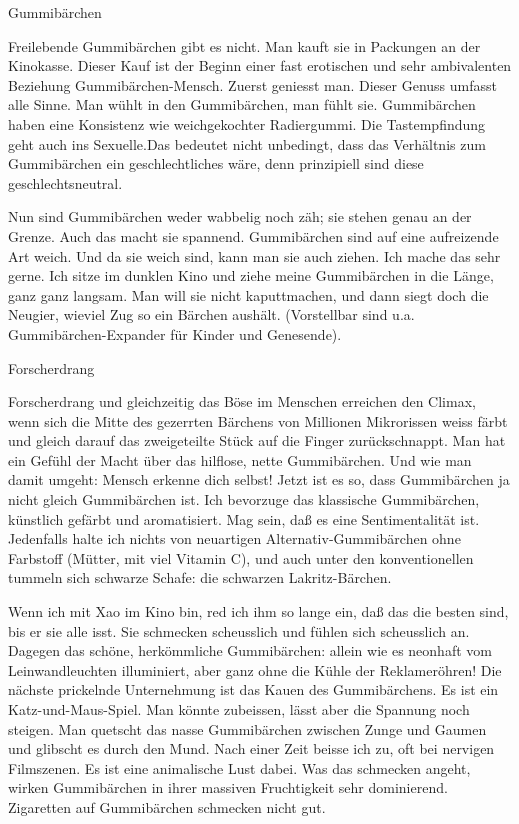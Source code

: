 Gummibärchen

Freilebende Gummibärchen gibt es nicht. Man kauft sie in Packungen an der Kinokasse. Dieser Kauf ist der Beginn einer fast erotischen und sehr ambivalenten Beziehung Gummibärchen-Mensch. Zuerst geniesst man. Dieser Genuss umfasst alle Sinne. Man wühlt in den Gummibärchen, man fühlt sie. Gummibärchen haben eine Konsistenz wie weichgekochter Radiergummi. Die Tastempfindung geht auch ins Sexuelle.Das bedeutet nicht unbedingt, dass das Verhältnis zum Gummibärchen ein geschlechtliches wäre, denn prinzipiell sind diese geschlechtsneutral.

Nun sind Gummibärchen weder wabbelig noch zäh; sie stehen genau an der Grenze. Auch das macht sie spannend. Gummibärchen sind auf eine aufreizende Art weich. Und da sie weich sind, kann man sie auch ziehen. Ich mache das sehr gerne. Ich sitze im dunklen Kino und ziehe meine Gummibärchen in die Länge, ganz ganz langsam. Man will sie nicht kaputtmachen, und dann siegt doch die Neugier, wieviel Zug so ein Bärchen aushält. (Vorstellbar sind u.a. Gummibärchen-Expander für Kinder und Genesende).

Forscherdrang

Forscherdrang und gleichzeitig das Böse im Menschen erreichen den Climax, wenn sich die Mitte des gezerrten Bärchens von Millionen Mikrorissen weiss färbt und gleich darauf das zweigeteilte Stück auf die Finger zurückschnappt. Man hat ein Gefühl der Macht über das hilflose, nette Gummibärchen. Und wie man damit umgeht: Mensch erkenne dich selbst! Jetzt ist es so, dass Gummibärchen ja nicht gleich Gummibärchen ist. Ich bevorzuge das klassische Gummibärchen, künstlich gefärbt und aromatisiert. Mag sein, daß es eine Sentimentalität ist. Jedenfalls halte ich nichts von neuartigen Alternativ-Gummibärchen ohne Farbstoff (Mütter, mit viel Vitamin C), und auch unter den konventionellen tummeln sich schwarze Schafe: die schwarzen Lakritz-Bärchen.

Wenn ich mit Xao im Kino bin, red ich ihm so lange ein, daß das die besten sind, bis er sie alle isst. Sie schmecken scheusslich und fühlen sich scheusslich an. Dagegen das schöne, herkömmliche Gummibärchen: allein wie es neonhaft vom Leinwandleuchten illuminiert, aber ganz ohne die Kühle der Reklameröhren! Die nächste prickelnde Unternehmung ist das Kauen des Gummibärchens. Es ist ein Katz-und-Maus-Spiel. Man könnte zubeissen, lässt aber die Spannung noch steigen. Man quetscht das nasse Gummibärchen zwischen Zunge und Gaumen und glibscht es durch den Mund. Nach einer Zeit beisse ich zu, oft bei nervigen Filmszenen. Es ist eine animalische Lust dabei. Was das schmecken angeht, wirken Gummibärchen in ihrer massiven Fruchtigkeit sehr dominierend. Zigaretten auf Gummibärchen schmecken nicht gut.

